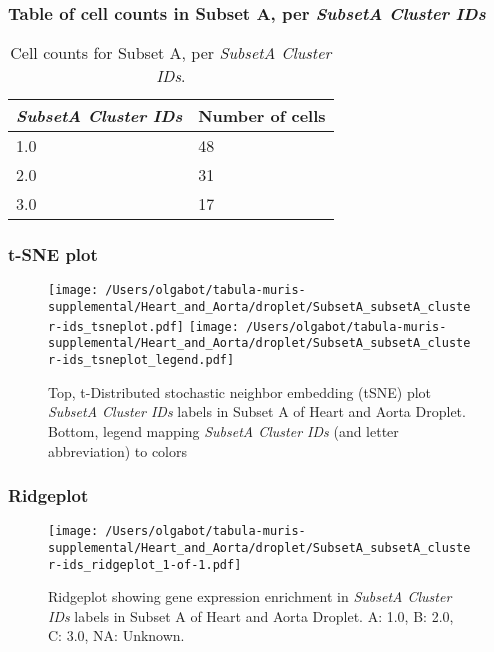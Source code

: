 \subsubsection{Table of cell counts in Subset A, per \emph{SubsetA Cluster IDs}}\begin{table}[h]
\centering
\label{my-label}
\begin{tabular}{@{}ll@{}}
\toprule

\emph{SubsetA Cluster IDs}& Number of cells \\ \midrule
1.0 & 48 \\

2.0 & 31 \\

3.0 & 17 \\
\bottomrule
\end{tabular}
\caption{Cell counts for Subset A, per \emph{SubsetA Cluster IDs}.}
\end{table}

\clearpage
\subsubsection{t-SNE plot}
\begin{figure}[h]
\centering
\texttt{[image: /Users/olgabot/tabula-muris-supplemental/Heart\_and\_Aorta/droplet/SubsetA\_subsetA\_cluster-ids\_tsneplot.pdf]}
\texttt{[image: /Users/olgabot/tabula-muris-supplemental/Heart\_and\_Aorta/droplet/SubsetA\_subsetA\_cluster-ids\_tsneplot\_legend.pdf]}
\caption{Top, t-Distributed stochastic neighbor embedding (tSNE) plot  \emph{SubsetA Cluster IDs} labels in Subset A of Heart and Aorta Droplet. Bottom, legend mapping \emph{SubsetA Cluster IDs} (and letter abbreviation) to colors}
\end{figure}


\clearpage

\subsubsection{Ridgeplot}
\begin{figure}[h]
\centering
\texttt{[image: /Users/olgabot/tabula-muris-supplemental/Heart\_and\_Aorta/droplet/SubsetA\_subsetA\_cluster-ids\_ridgeplot\_1-of-1.pdf]}

\caption{ Ridgeplot  showing gene expression enrichment in \emph{SubsetA Cluster IDs} labels in Subset A of Heart and Aorta Droplet. A: 1.0, B: 2.0, C: 3.0, NA: Unknown.}
\end{figure}


